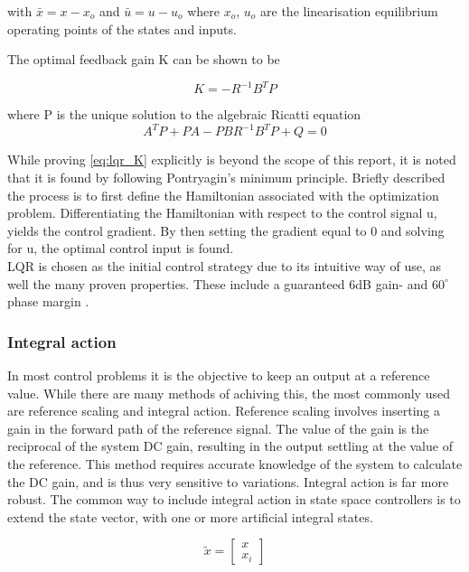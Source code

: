 with $\bar{x} = x-x_o$ and $\bar{u} = u-u_o$ where $x_o$, $u_o$ are the linearisation equilibrium operating points of the states and inputs.

The optimal feedback gain K can be shown to be

\begin{equation} \label{eq:lqr_K}
	K = -R^{-1}B^{T}P
\end{equation}

where P is the unique solution to the algebraic Ricatti equation
\begin{equation} \label{eq:ricatti}
	A^TP + PA - PBR^{-1}B^TP+Q = 0
\end{equation}

While proving \cref{eq:lqr_K} explicitly is beyond the scope of this report, it is noted that it is found by following Pontryagin's minimum principle. Briefly described the process is to first define the Hamiltonian associated with the optimization problem. Differentiating the Hamiltonian with respect to the control signal u, yields the control gradient. By then setting the gradient equal to 0 and solving for u, the optimal control input is found.
\\


LQR is chosen as the initial control strategy due to its intuitive way of use, as well the many proven properties. These include a guaranteed 6dB gain- and $60^\circ$ phase margin \cite{Doyle}.

\subsubsection{Integral action}
In most control problems it is the objective to keep an output at a reference value. While there are many methods of achiving this, the most commonly used are reference scaling and integral action. Reference scaling involves inserting a gain in the forward path of the reference signal. The value of the gain is the reciprocal of the system DC gain, resulting in the output settling at the value of the reference. This method requires accurate knowledge of the system to calculate the DC gain, and is thus very sensitive to variations. Integral action is far more robust. The common way to include integral action in state space controllers is to extend the state vector, with one or more artificial integral states.

\begin{equation}
	\tilde{x} = \begin{bmatrix}
		x \\
		x_i
	\end{bmatrix}
\end{equation}


